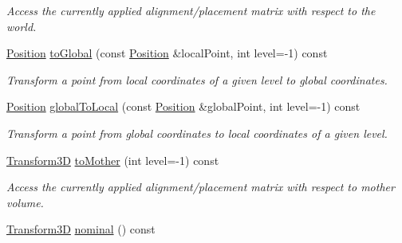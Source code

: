 \begin{DoxyCompactItemize}
\begin{DoxyCompactList}\small\item\em Access the currently applied alignment/placement matrix with respect to the world. \item\end{DoxyCompactList}\item 
\hyperlink{class_d_d4hep_1_1_alignments_1_1_global_alignment_a9cd5167ec3a33a95ca76a9c7fe06271e}{Position} \hyperlink{class_d_d4hep_1_1_alignments_1_1_global_alignment_a1ae3bd19e88fdf178a5595f829d0210a}{toGlobal} (const \hyperlink{class_d_d4hep_1_1_alignments_1_1_global_alignment_a9cd5167ec3a33a95ca76a9c7fe06271e}{Position} \&localPoint, int level=-\/1) const 
\begin{DoxyCompactList}\small\item\em Transform a point from local coordinates of a given level to global coordinates. \item\end{DoxyCompactList}\item 
\hyperlink{class_d_d4hep_1_1_alignments_1_1_global_alignment_a9cd5167ec3a33a95ca76a9c7fe06271e}{Position} \hyperlink{class_d_d4hep_1_1_alignments_1_1_global_alignment_afbb2091137975e333688b024d9781d42}{globalToLocal} (const \hyperlink{class_d_d4hep_1_1_alignments_1_1_global_alignment_a9cd5167ec3a33a95ca76a9c7fe06271e}{Position} \&globalPoint, int level=-\/1) const 
\begin{DoxyCompactList}\small\item\em Transform a point from global coordinates to local coordinates of a given level. \item\end{DoxyCompactList}\item 
\hyperlink{class_d_d4hep_1_1_alignments_1_1_global_alignment_a328240cbc53ba92424336a5898ba49d3}{Transform3D} \hyperlink{class_d_d4hep_1_1_alignments_1_1_global_alignment_ab1d4442ce582827d0db9680ce7dc5b4b}{toMother} (int level=-\/1) const 
\begin{DoxyCompactList}\small\item\em Access the currently applied alignment/placement matrix with respect to mother volume. \item\end{DoxyCompactList}\item 
\hyperlink{class_d_d4hep_1_1_alignments_1_1_global_alignment_a328240cbc53ba92424336a5898ba49d3}{Transform3D} \hyperlink{class_d_d4hep_1_1_alignments_1_1_global_alignment_a975ed8070110b96afc671388d8b3e31f}{nominal} () const 

\end{DoxyCompactItemize}
